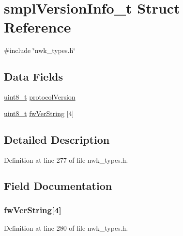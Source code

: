 \hypertarget{structsmplVersionInfo__t}{\section{smpl\-Version\-Info\-\_\-t \-Struct \-Reference}
\label{structsmplVersionInfo__t}
}


{\ttfamily \#include \char`\"{}nwk\-\_\-types.\-h\char`\"{}}

\subsection*{\-Data \-Fields}
\begin{DoxyCompactItemize}
\item 
\hyperlink{bsp__msp430__defs_8h_aba7bc1797add20fe3efdf37ced1182c5}{uint8\-\_\-t} \hyperlink{structsmplVersionInfo__t_a69ba4ce44c8b3df5af22db880cdb9c20}{protocol\-Version}
\item 
\hyperlink{bsp__msp430__defs_8h_aba7bc1797add20fe3efdf37ced1182c5}{uint8\-\_\-t} \hyperlink{structsmplVersionInfo__t_a3276b46fb43e043f84b30bf9d61b7a46}{fw\-Ver\-String} \mbox{[}4\mbox{]}
\end{DoxyCompactItemize}


\subsection{\-Detailed \-Description}


\-Definition at line 277 of file nwk\-\_\-types.\-h.



\subsection{\-Field \-Documentation}
\hypertarget{structsmplVersionInfo__t_a3276b46fb43e043f84b30bf9d61b7a46}{
\subsubsection[{fw\-Ver\-String}]{ {\bf fw\-Ver\-String}\mbox{[}4\mbox{]}}}\label{structsmplVersionInfo__t_a3276b46fb43e043f84b30bf9d61b7a46}


\-Definition at line 280 of file nwk\-\_\-types.\-h.

